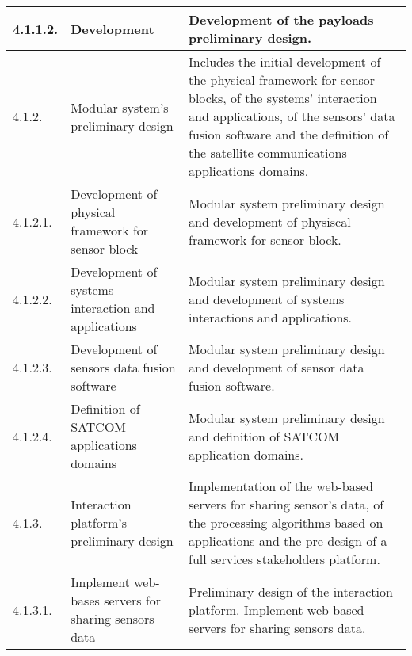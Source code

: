 \begin{longtable}[H]{l >{\raggedright\arraybackslash}p{4cm} p{8cm}}
	\midrule
	
	4.1.1.2. & Development & Development of the payloads preliminary design.\vspace{0.2cm} \\
	
	\midrule
	
	4.1.2. & Modular system's preliminary design & Includes the initial development of the physical framework for sensor blocks, of the systems' interaction and applications, of the sensors' data fusion software and the definition of the satellite communications applications domains.\vspace{0.2cm} \\
	
	\midrule
	
	4.1.2.1. & Development of physical framework for sensor block & Modular system preliminary design and development of physiscal framework for sensor block.\vspace{0.2cm} \\
	
	\midrule
	
	4.1.2.2. & Development of systems interaction and applications & Modular system preliminary design and development of systems interactions and applications.\vspace{0.2cm} \\
	
	\midrule
	
	4.1.2.3. & Development of sensors data fusion software & Modular system preliminary design and development of sensor data fusion software.\vspace{0.2cm} \\
	
	\midrule
	
	4.1.2.4. & Definition of SATCOM applications domains & Modular system preliminary design and definition of SATCOM application domains.\vspace{0.2cm} \\
	
	\midrule
	
	4.1.3. & Interaction platform's preliminary design & Implementation of the web-based servers for sharing sensor's data, of the processing algorithms based on applications and the pre-design of a full services stakeholders platform.\vspace{0.2cm} \\
	
	\midrule
	
	4.1.3.1. & Implement web-bases servers for sharing sensors data & Preliminary design of the interaction platform. Implement web-based servers for sharing sensors data.\vspace{0.2cm} \\
	

\end{longtable}
